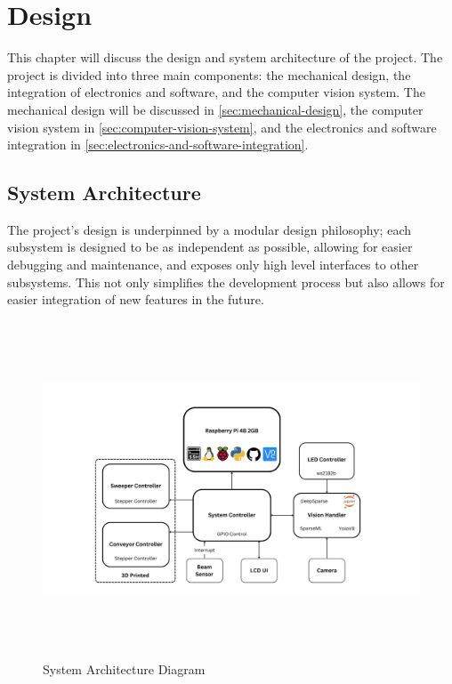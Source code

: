 \section{Design}
\label{sec:design-and-system-architecture}

This chapter will discuss the design and system architecture of the project. The project is divided into three main components: the mechanical design, the integration of electronics and software, and the computer vision system. The mechanical design will be discussed in \autoref{sec:mechanical-design}, the computer vision system in \autoref{sec:computer-vision-system}, and the electronics and software integration in \autoref{sec:electronics-and-software-integration}.

\subsection{System Architecture}
\label{sec:system-architecture}

The project's design is underpinned by a modular design philosophy; each subsystem is designed to be as independent as possible, allowing for easier debugging and maintenance, and exposes only high level interfaces to other subsystems. This not only simplifies the development process but also allows for easier integration of new features in the future.

\begin{figure}[H]
    \begin{minipage}[h]{\textwidth}
        \centering
        \includegraphics[height=10cm]{imgs/diagrams/System Diagram.png}
        \caption{System Architecture Diagram}
    \end{minipage}
\end{figure}

